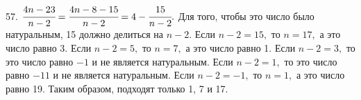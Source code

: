 57. $\cfrac{4n-23}{n-2}=\cfrac{4n-8-15}{n-2}=4-\cfrac{15}{n-2}.$ Для того, чтобы это число было натуральным, 15 должно делиться на $n-2.$ Если $n-2=15,$ то $n=17,$ а это число равно 3. Если $n-2=5,$ то $n=7,$ а это число равно 1. Если $n-2=3,$ то это число равно $-1$ и не является натуральным. Если $n-2=1,$ то это число равно $-11$ и не является натуральным. Если $n-2=-1,$ то $n=1,$ а это число равно 19. Таким образом, подходят только 1, 7 и 17.\\
